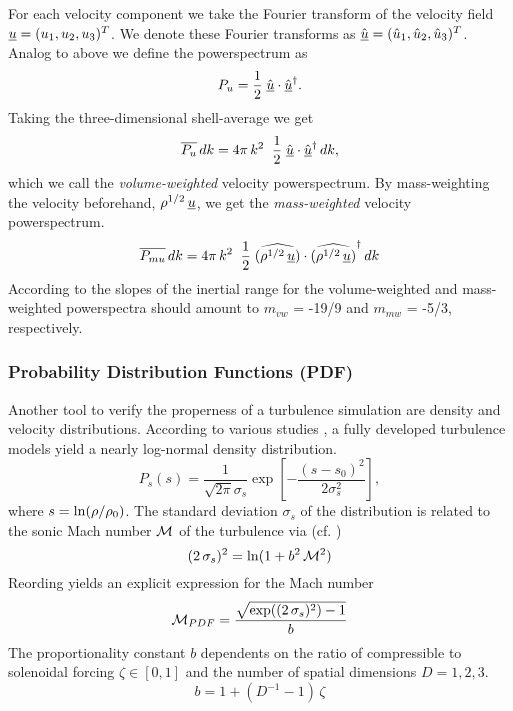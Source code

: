 For each velocity component we take the Fourier transform of the velocity field
$\underline{u} = (u_1, u_2, u_3)^T$.
We denote these Fourier transforms as
$\hat{\underline{u}} = (\hat{u}_1, \hat{u}_2, \hat{u}_3)^T$. Analog
to above we define the powerspectrum as
\begin{equation}
    P_{u} = \frac{1}{2} \; \hat{\underline{u}} \cdot \hat{\underline{u}}^{\dagger}.
\end{equation}
Taking the three-dimensional shell-average we get
\begin{equation}
    \overline{P_{u}}\,dk = 4 \pi\,k^2 \;\; \frac{1}{2} \; \hat{\underline{u}} \cdot \hat{\underline{u}}^{\dagger}\,dk,
\end{equation}
which we call the \emph{volume-weighted} velocity powerspectrum. By
mass-weighting the velocity beforehand, $\rho^{1/2}\,\underline{u}$, we get the
\emph{mass-weighted} velocity powerspectrum.
\begin{equation}
    \overline{P_{mu}}\,dk = 4 \pi\,k^2 \;\; \frac{1}{2} \; \widehat{(\rho^{1/2}\,\underline{u})} \cdot \widehat{(\rho^{1/2}\,\underline{u})}^{\dagger}\,dk
\end{equation}
According to \cite{kitsionas2009algorithmic} the slopes of the inertial range
for the volume-weighted and mass-weighted powerspectra should amount to
$m_{vw}$ = -19/9 and $m_{mw}$ = -5/3, respectively.

\subsubsection{Probability Distribution Functions (PDF)}
\label{sec:theory-density-pdf}
Another tool to verify the properness of a turbulence simulation are density
and velocity distributions. According to various studies
\cite{federrath_klessen_schmidt_2008,hopkins_2013,1999intu.conf21,0004-637X-761-2-149},
a fully developed turbulence models yield a nearly log-normal density
distribution.
\begin{equation}
\label{eqn:density-pdf}
P_s(s) = \frac{1}{\sqrt{2\pi}\sigma_s} \exp\left[-\frac{(s-s_0)^2}{2\sigma_s^2}\right],
\end{equation}
where $s = \ln(\rho/\rho_0)$. The standard deviation $\sigma_s$ of
the distribution is related to the sonic Mach number $\mathcal{M}$ of the
turbulence via (cf. \cite{federrath_klessen_schmidt_2008,0004-637X-761-2-149})
\begin{equation}
(2\,\sigma_s)^2 = \ln(1 + b^2\,\mathcal{M}^2)
\end{equation}
Reording yields an explicit expression for the Mach number
\begin{equation}
\label{eqn:density-pdf-mach}
\mathcal{M}_{PDF} = \frac{\sqrt{\exp((2\,\sigma_s)^2) - 1}}{b}
\end{equation}
The proportionality constant $b$ dependents on the ratio of compressible to
solenoidal forcing $\zeta \in [0,1]$ and the number of spatial
dimensions $D = 1,2,3$.
\begin{equation}
\label{eqn:density-pdf-mach-constant}
b = 1 + (D^{-1} - 1) \, \zeta
\end{equation}
